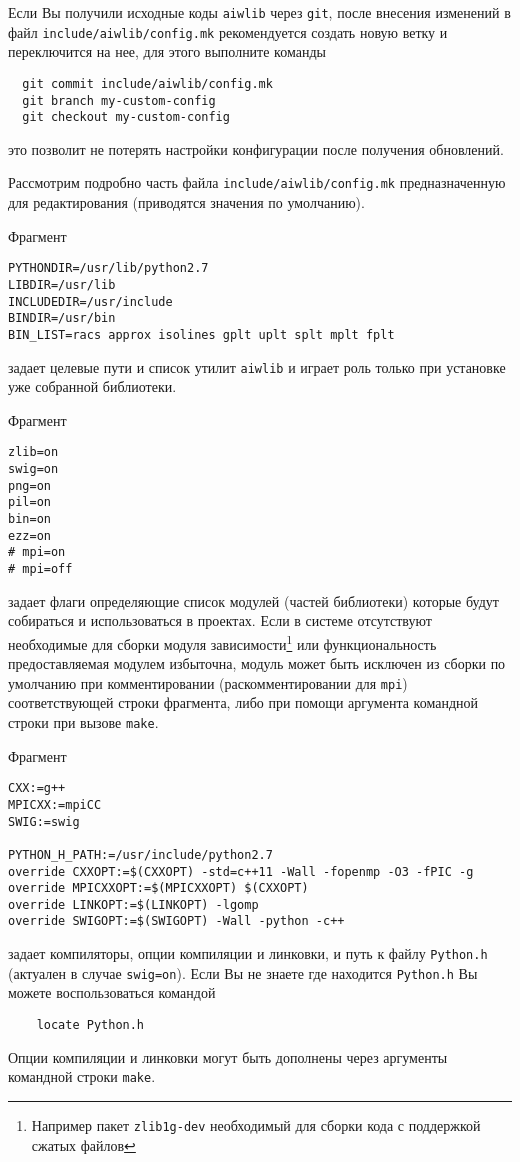 Если Вы получили исходные коды \verb'aiwlib' через \verb'git', после
внесения изменений в файл \verb'include/aiwlib/config.mk'
рекомендуется создать новую ветку и переключится на нее, для этого выполните
команды
\begin{verbatim}
  git commit include/aiwlib/config.mk
  git branch my-custom-config
  git checkout my-custom-config
\end{verbatim}
это позволит не потерять настройки конфигурации после получения обновлений.

Рассмотрим подробно часть файла \verb'include/aiwlib/config.mk'
предназначенную для редактирования (приводятся значения по
умолчанию).

Фрагмент
\begin{verbatim}
PYTHONDIR=/usr/lib/python2.7
LIBDIR=/usr/lib
INCLUDEDIR=/usr/include
BINDIR=/usr/bin
BIN_LIST=racs approx isolines gplt uplt splt mplt fplt
\end{verbatim}
задает целевые пути и список утилит \verb'aiwlib' и играет роль только
при установке уже собранной библиотеки.

Фрагмент 
\begin{verbatim}
zlib=on
swig=on
png=on
pil=on
bin=on
ezz=on
# mpi=on
# mpi=off
\end{verbatim}
задает флаги определяющие список модулей (частей библиотеки) которые будут собираться
и использоваться в проектах. Если в системе отсутствуют необходимые для
сборки модуля зависимости\footnote{Например пакет {\tt zlib1g-dev}
  необходимый для сборки кода с поддержкой сжатых файлов} или
функциональность предоставляемая модулем избыточна, модуль может быть
исключен из сборки по умолчанию при комментировании
(раскомментировании для \verb'mpi') соответствующей
строки фрагмента, либо при помощи аргумента командной строки при
вызове \verb'make'.


\newpage
Фрагмент 
\begin{verbatim}
CXX:=g++
MPICXX:=mpiCC
SWIG:=swig

PYTHON_H_PATH:=/usr/include/python2.7
override CXXOPT:=$(CXXOPT) -std=c++11 -Wall -fopenmp -O3 -fPIC -g 
override MPICXXOPT:=$(MPICXXOPT) $(CXXOPT)
override LINKOPT:=$(LINKOPT) -lgomp 
override SWIGOPT:=$(SWIGOPT) -Wall -python -c++ 
\end{verbatim}
задает компиляторы, опции компиляции и линковки, и путь к файлу \verb'Python.h'
(актуален в случае \verb'swig=on'). Если Вы не знаете где находится
\verb'Python.h'
Вы можете воспользоваться командой
\begin{verbatim}
    locate Python.h
\end{verbatim}
Опции компиляции и линковки могут быть дополнены через аргументы
командной строки \verb'make'.

